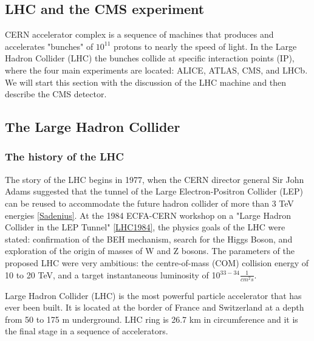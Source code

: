 

\begin{normalsize}



\chapter{LHC and the CMS experiment}
\label{ch:cms}
CERN accelerator complex is a sequence of machines that produces and accelerates "bunches" of $10^{11}$ protons to nearly the speed of light. In the Large Hadron Collider (LHC) the bunches collide at specific interaction points (IP), where the four main experiments are located: ALICE, ATLAS, CMS, and LHCb. We will start this section with the discussion of the LHC machine and then describe the CMS detector. 

\section{The Large Hadron Collider}\label{sec:cms_intro}



\subsection{The history of the LHC}

The story of the LHC begins in 1977, when the CERN director general Sir John Adams suggested that the tunnel of the Large Electron-Positron Collider (LEP) can be reused to accommodate the future hadron collider of more than 3 TeV energies \ref{Sadenius}. At the 1984 ECFA-CERN workshop on a "Large Hadron Collider in the LEP Tunnel" \ref{LHC1984}, the physics goals of the LHC were stated: confirmation of the BEH mechanism, search for the Higgs Boson, and exploration of the origin of masses of W and Z bosons. The parameters of the proposed LHC were very ambitious: the centre-of-mass (COM) collision energy of 10 to 20 TeV, and a target instantaneous luminosity of 10$^{33-34}\frac{1}{cm^{2}s}$. 

Large Hadron Collider (LHC) is the most powerful particle accelerator that has ever been built. It is located at the border of France and Switzerland at a depth from 50 to 175 m underground. LHC ring is 26.7 km in circumference and it is the final stage in a sequence of accelerators. 



\end{normalsize}
